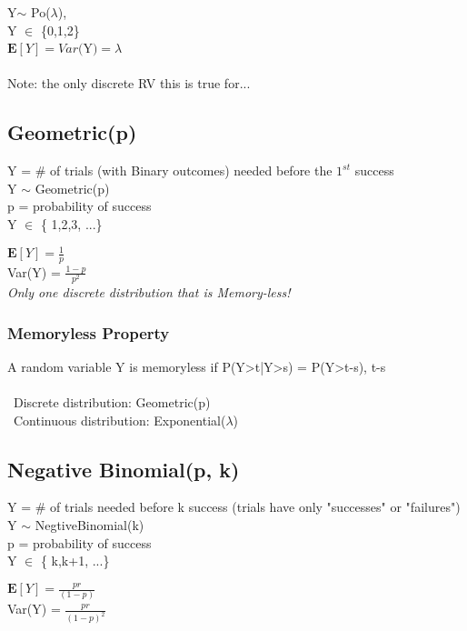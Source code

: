 \documentclass[]{article}
\begin{document}
Y$\sim$ Po($\lambda$),\\ 
\indent Y $\in$ \{0,1,2\}\\
\indent$\mathbf{E}[Y] = Var($Y$) = \lambda$\\\\
Note: the only discrete RV this is true for...




\subsection*{Geometric(p)}

Y = \# of trials (with Binary outcomes) needed before the $1^{st}$ success\\
Y $\sim$ Geometric(p)\\
p = probability of success\\

Y $\in$ \{ 1,2,3, ...\}

$\mathbf{E}[Y] = \frac{1}{p}$\\
Var(Y) = $\frac{1-p}{p^2}$\\

\textit{Only one discrete distribution that is Memory-less!}
\subsubsection*{Memoryless Property}
A random variable Y is memoryless if P(Y>t|Y>s) = P(Y>t-s), t-s\\\\
\textbullet \ Discrete distribution: Geometric(p)\\
\textbullet \ Continuous distribution: Exponential($\lambda$)



\subsection*{Negative Binomial(p, k)}

Y = \# of trials needed before k success (trials have only "successes" or "failures")\\
Y $\sim$ NegtiveBinomial(k)\\
p = probability of success\\

Y $\in$ \{ k,k+1, ...\}

$\mathbf{E}[Y] = \frac{pr}{(1-p)}$\\
Var(Y) = $\frac{pr}{(1-p)^2}$\\
\end{document}
